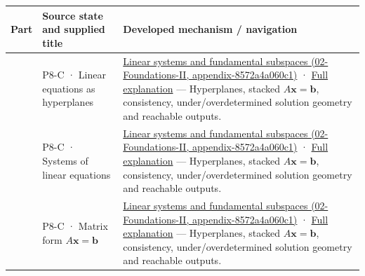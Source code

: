 {\def\LTcaptype{none} %
\begin{longtable}[]{@{}
  >{\raggedright\arraybackslash}p{}
  >{\raggedright\arraybackslash}p{}
  >{\raggedright\arraybackslash}p{}@{}}
\toprule\noalign{}
\begin{minipage}[b]{\linewidth}\raggedright
Part
\end{minipage} & \begin{minipage}[b]{\linewidth}\raggedright
Source state and supplied title
\end{minipage} & \begin{minipage}[b]{\linewidth}\raggedright
Developed mechanism / navigation
\end{minipage} \\
\midrule\noalign{}
\endhead
\bottomrule\noalign{}
\endlastfoot
701 & P8-C · Linear equations as hyperplanes & \href{../02-Foundations-II/main.pdf\#nameddest=appendix-8572a4a060c1}{Linear systems and fundamental subspaces (02-Foundations-II, appendix-8572a4a060c1)} · \href{Continuous\%20Notes/Computing\%20Foundations\%20-\%20From\%20Bits\%20to\%20C++\%20and\%20Systems\%20APIs\#A\%20system\%20is\%20an\%20intersection\%20of\%20constraints/}{Full explanation} --- Hyperplanes, stacked \(A\mathbf x=\mathbf b\), consistency, under/overdetermined solution geometry and reachable outputs. \\
702 & P8-C · Systems of linear equations & \href{../02-Foundations-II/main.pdf\#nameddest=appendix-8572a4a060c1}{Linear systems and fundamental subspaces (02-Foundations-II, appendix-8572a4a060c1)} · \href{Continuous\%20Notes/Computing\%20Foundations\%20-\%20From\%20Bits\%20to\%20C++\%20and\%20Systems\%20APIs\#A\%20system\%20is\%20an\%20intersection\%20of\%20constraints/}{Full explanation} --- Hyperplanes, stacked \(A\mathbf x=\mathbf b\), consistency, under/overdetermined solution geometry and reachable outputs. \\
703 & P8-C · Matrix form \(A\mathbf x=\mathbf b\) & \href{../02-Foundations-II/main.pdf\#nameddest=appendix-8572a4a060c1}{Linear systems and fundamental subspaces (02-Foundations-II, appendix-8572a4a060c1)} · \href{Continuous\%20Notes/Computing\%20Foundations\%20-\%20From\%20Bits\%20to\%20C++\%20and\%20Systems\%20APIs\#A\%20system\%20is\%20an\%20intersection\%20of\%20constraints/}{Full explanation} --- Hyperplanes, stacked \(A\mathbf x=\mathbf b\), consistency, under/overdetermined solution geometry and reachable outputs. \\

\end{longtable}}
